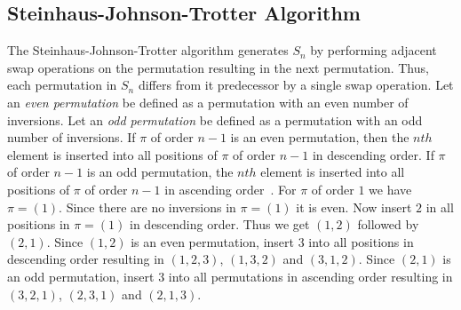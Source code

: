 \subsection{Steinhaus-Johnson-Trotter Algorithm}
The Steinhaus-Johnson-Trotter algorithm generates $S_{n}$ by performing adjacent swap operations 
on the permutation resulting in the next permutation. Thus, each permutation in $S_{n}$ differs 
from it predecessor by a single swap operation. Let an \emph{even permutation} be defined as a permutation 
with an even number of inversions. Let an \emph{odd permutation} be defined as a 
permutation with an odd number of inversions. If $\pi$ of order $n-1$ is an even permutation, then the $nth$ element is inserted into all 
positions of $\pi$ of order $n-1$ in descending order. 
If $\pi$ of order $n-1$ is an odd permutation, the $nth$ element is inserted into all positions of $\pi$ of order $n-1$ in ascending order~\cite{A25}. 
For $\pi$ of order $1$ we have $\pi=(1)$. Since 
there are no inversions in $\pi=(1)$ it is even. Now insert $2$ in all positions in $\pi=(1)$
in descending order. Thus we get $(1,2)$ followed by $(2,1)$. Since $(1,2)$ is 
an even permutation, insert $3$ into all positions in descending order resulting in $(1,2,3)$,
$(1,3,2)$ and $(3,1,2)$. Since $(2,1)$ is an odd permutation, insert $3$ 
into all permutations in ascending order resulting in $(3,2,1)$, $(2,3,1)$ and $(2,1,3)$.\par 

